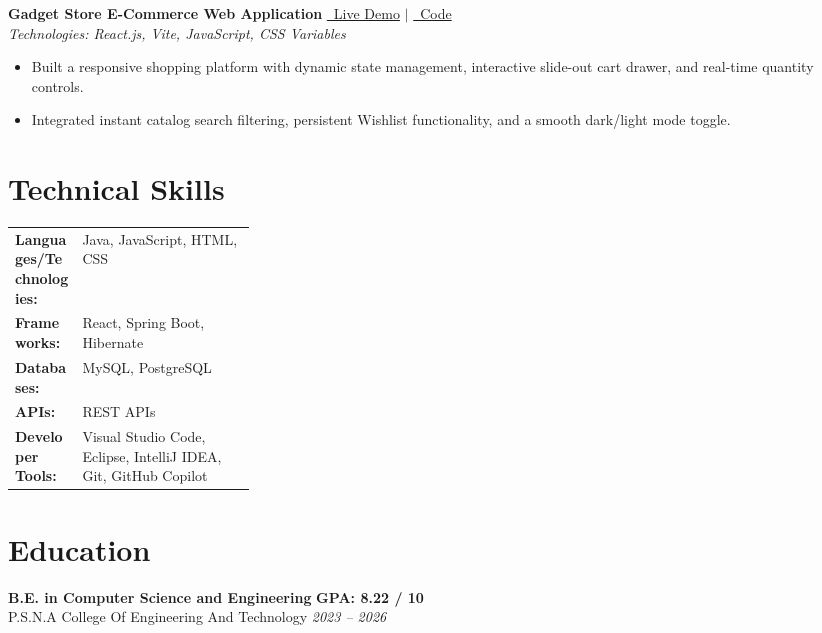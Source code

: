 \documentclass[a4paper,11pt]{article}
\begin{document}
\vspace{3pt}
\noindent
\textbf{Gadget Store E-Commerce Web Application} \hfill \href{https://gadget-store-using-react.vercel.app/}{\faExternalLink*\ Live Demo} \quad $|$ \quad \href{https://github.com/Kishorekumar-2004/Gadget_Store-using-React}{\faGithub\ Code} \\
\textit{Technologies: React.js, Vite, JavaScript, CSS Variables}
\begin{itemize}
    \item Built a responsive shopping platform with dynamic state management, interactive slide-out cart drawer, and real-time quantity controls.
    \item Integrated instant catalog search filtering, persistent Wishlist functionality, and a smooth dark/light mode toggle.
\end{itemize}

\section{Technical Skills}
\begin{tabularx}{\linewidth}{@{}p{0.28\linewidth} X@{}}
\textbf{Languages/Technologies:} & Java, JavaScript, HTML, CSS \\
\textbf{Frameworks:} & React, Spring Boot, Hibernate \\
\textbf{Databases:} & MySQL, PostgreSQL \\
\textbf{APIs:} & REST APIs \\
\textbf{Developer Tools:} & Visual Studio Code, Eclipse, IntelliJ IDEA, Git, GitHub Copilot \\
\end{tabularx}

\section{Education}

\noindent
\textbf{B.E. in Computer Science and Engineering} \hfill \textbf{GPA: 8.22 / 10} \\
P.S.N.A College Of Engineering And Technology \hfill \textit{2023 -- 2026}
\end{document}
